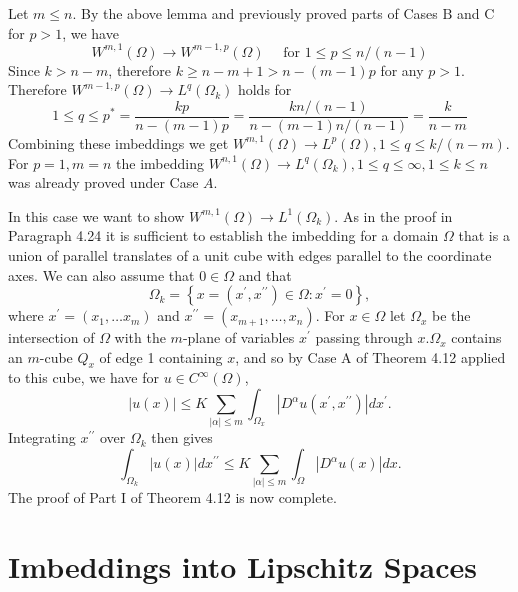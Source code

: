 \begin{para}[Proof of Part I, Cases B and C of Theorem 4.12 for $\bm{p=1}$, $\bm{k>n-m}$]
  Let $m \leq n$. By the above lemma and previously proved parts of Cases $\mathrm{B}$ and $\mathrm{C}$ for $p>1$, we have
  \[
  W^{m, 1}(\Omega) \rightarrow W^{m-1, p}(\Omega) \quad \text { for } 1 \leq p \leq n /(n-1)
  \]
  Since $k>n-m$, therefore $k \geq n-m+1>n-(m-1) p$ for any $p>1$. Therefore $W^{m-1, p}(\Omega) \rightarrow L^q(\Omega_k)$ holds for
  \[
  1 \leq q \leq p^*=\frac{k p}{n-(m-1) p}=\frac{k n /(n-1)}{n-(m-1) n /(n-1)}=\frac{k}{n-m}
  \]
  Combining these imbeddings we get $W^{m, 1}(\Omega) \rightarrow L^p(\Omega), 1 \leq q \leq k /(n-m)$.
  For $p=1, m=n$ the imbedding $W^{n, 1}(\Omega) \rightarrow L^q(\Omega_k), 1 \leq q \leq \infty, 1 \leq k \leq n$ was already proved under Case $A$.
\end{para}


\begin{para}[Proof of Part I, Case C of Theorem 4.12 for $\bm{p=1}$, $\bm{k=n-m}$]
  In this case we want to show $W^{m, 1}(\Omega) \rightarrow L^1(\Omega_k)$.
  As in the proof in Paragraph 4.24 it is sufficient to establish the imbedding for a domain 
  $\Omega$ that is a union of parallel translates of a unit cube with edges parallel to the 
  coordinate axes. We can also assume that $0 \in \Omega$ and that
  \[
  \Omega_k=\left\{x=\left(x^{\prime}, x^{\prime \prime}\right) \in \Omega: x^{\prime}=0\right\},
  \]
  where $x^{\prime}=\left(x_1, \ldots x_m\right)$ and $x^{\prime \prime}=\left(x_{m+1}, \ldots, x_n\right)$. For $x \in \Omega$ let $\Omega_x$ be the intersection of $\Omega$ with the $m$-plane of variables $x^{\prime}$ passing through $x . \Omega_x$ contains an $m$-cube $Q_x$ of edge 1 containing $x$, and so by Case A of Theorem 4.12 applied to this cube, we have for $u \in C^{\infty}(\Omega)$,
  \[
  |u(x)| \leq K \sum_{|\alpha| \leq m} \int_{\Omega_x}\left|D^\alpha u\left(x^{\prime}, x^{\prime \prime}\right)\right| d x^{\prime} .
  \]
  Integrating $x^{\prime \prime}$ over $\Omega_k$ then gives
  \[
  \int_{\Omega_k}|u(x)| d x^{\prime \prime} \leq K \sum_{|\alpha| \leq m} \int_{\Omega}\left|D^\alpha u(x)\right| d x .
  \]
  The proof of Part I of Theorem 4.12 is now complete.
\end{para}


\section{Imbeddings into Lipschitz Spaces}


